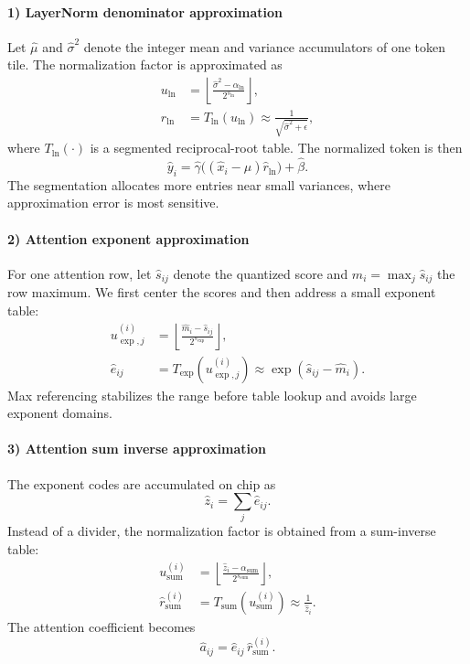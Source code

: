 \documentclass[journal]{IEEEtran}
\begin{document}
\paragraph*{1) LayerNorm denominator approximation}
Let $\hat{\mu}$ and $\hat{\sigma}^2$ denote the integer mean and variance accumulators of one token tile. The normalization factor is approximated as
\begin{align}
u_{\mathrm{ln}} &= \left\lfloor \frac{\hat{\sigma}^2-\alpha_{\mathrm{ln}}}{2^{s_{\mathrm{ln}}}} \right\rfloor,\\
\hat r_{\mathrm{ln}} &= T_{\mathrm{ln}}(u_{\mathrm{ln}})
\approx \frac{1}{\sqrt{\hat{\sigma}^2+\epsilon}},
\end{align}
where $T_{\mathrm{ln}}(\cdot)$ is a segmented reciprocal-root table. The normalized token is then
\begin{equation}
\hat y_i = \hat\gamma \big((\hat x_i-\hat\mu)\hat r_{\mathrm{ln}}\big) + \hat\beta.
\end{equation}
The segmentation allocates more entries near small variances, where approximation error is most sensitive.

\paragraph*{2) Attention exponent approximation}
For one attention row, let $\hat s_{ij}$ denote the quantized score and $\hat m_i=\max_j \hat s_{ij}$ the row maximum. We first center the scores and then address a small exponent table:
\begin{align}
u^{(i)}_{\exp,j} &= \left\lfloor \frac{\hat m_i-\hat s_{ij}}{2^{s_{\exp}}}\right\rfloor,\\
\hat e_{ij} &= T_{\exp}\!\left(u^{(i)}_{\exp,j}\right)
\approx \exp\!\left(\hat s_{ij}-\hat m_i\right).
\end{align}
Max referencing stabilizes the range before table lookup and avoids large exponent domains.

\paragraph*{3) Attention sum inverse approximation}
The exponent codes are accumulated on chip as
\begin{equation}
\hat z_i = \sum_j \hat e_{ij}.
\end{equation}
Instead of a divider, the normalization factor is obtained from a sum-inverse table:
\begin{align}
u^{(i)}_{\mathrm{sum}} &= \left\lfloor \frac{\hat z_i-\alpha_{\mathrm{sum}}}{2^{s_{\mathrm{sum}}}} \right\rfloor,\\
\hat r^{(i)}_{\mathrm{sum}} &= T_{\mathrm{sum}}\!\left(u^{(i)}_{\mathrm{sum}}\right)
\approx \frac{1}{\hat z_i}.
\end{align}
The attention coefficient becomes
\begin{equation}
\hat a_{ij} = \hat e_{ij}\,\hat r^{(i)}_{\mathrm{sum}}.
\end{equation}
\end{document}
